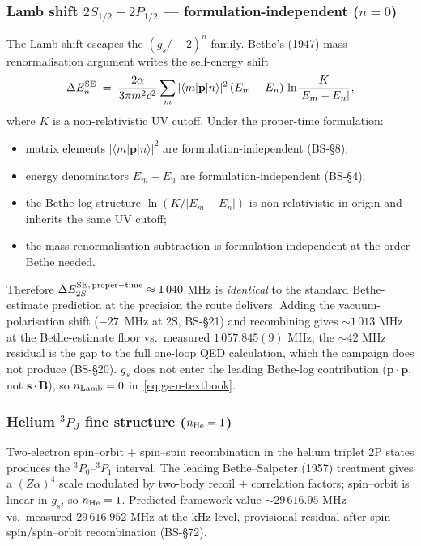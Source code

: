 \subsubsection{Lamb shift $2S_{1/2}{-}2P_{1/2}$ --- formulation-independent ($n = 0$)}

The Lamb shift escapes the $(g_s/{-}2)^n$ family. Bethe's (1947)
mass-renormalisation argument writes the self-energy shift
\begin{equation}
\label{eq:bethe-1947}
\Delta E_n^{\rm SE}
\;=\; \frac{2\alpha}{3\pi m^2 c^2}
   \sum_m |\langle m | \mathbf{p} | n \rangle|^2\,
         (E_m - E_n)\,
         \ln\!\frac{K}{|E_m - E_n|},
\end{equation}
where $K$ is a non-relativistic UV cutoff. Under the proper-time
formulation:
\begin{itemize}[topsep=2pt,itemsep=0pt]
  \item matrix elements $|\langle m | \mathbf{p} | n\rangle|^2$ are
        formulation-independent (BS-\S8);
  \item energy denominators $E_m - E_n$ are formulation-independent
        (BS-\S4);
  \item the Bethe-log structure $\ln(K/|E_m - E_n|)$ is non-relativistic in
        origin and inherits the same UV cutoff;
  \item the mass-renormalisation subtraction is formulation-independent at
        the order Bethe needed.
\end{itemize}
Therefore $\Delta E_{2S}^{\rm SE,\,proper-time} \approx 1\,040$ MHz is
\emph{identical} to the standard Bethe-estimate prediction at the precision
the route delivers. Adding the vacuum-polarisation shift ($-27$~MHz at 2S,
BS-\S21) and recombining gives $\sim 1\,013$ MHz at the Bethe-estimate
floor vs.~measured $1\,057.845(9)$ MHz; the $\sim 42$ MHz residual is the
gap to the full one-loop QED calculation, which the campaign does not
produce (BS-\S20).
$g_s$ does not enter the leading Bethe-log contribution
($\mathbf{p}\!\cdot\!\mathbf{p}$, not $\mathbf{s}\!\cdot\!\mathbf{B}$), so
$n_{\rm Lamb} = 0$ in~\eqref{eq:gs-n-textbook}.

\subsubsection{Helium ${}^3P_J$ fine structure ($n_{\rm He} = 1$)}

Two-electron spin--orbit + spin--spin recombination in the helium triplet
2P states produces the ${}^3P_0$--${}^3P_1$ interval. The leading
Bethe--Salpeter (1957) treatment gives a $(Z\alpha)^4$ scale modulated by
two-body recoil + correlation factors; spin--orbit is linear in $g_s$, so
$n_{\rm He} = 1$. Predicted framework value
$\sim 29\,616.95$ MHz vs.~measured $29\,616.952$ MHz at the kHz level,
provisional residual after spin--spin/spin--orbit recombination (BS-\S72).

